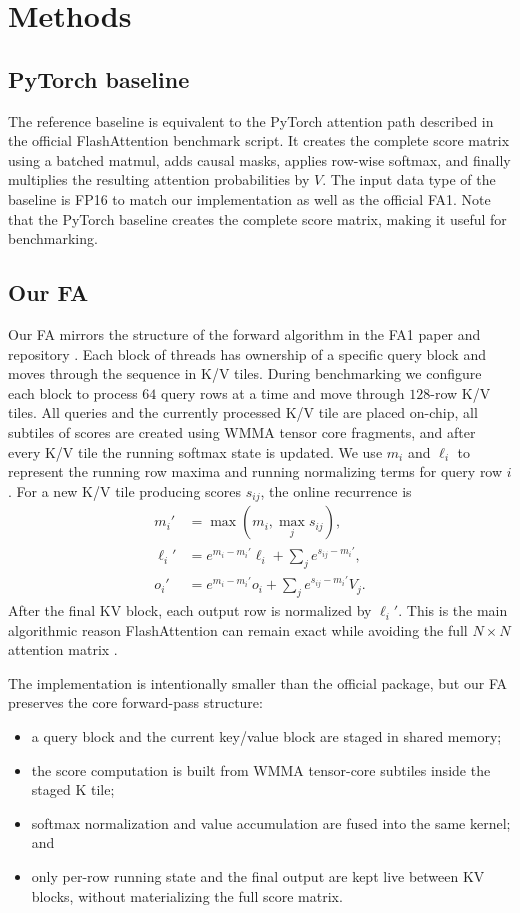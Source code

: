 \documentclass{article}
\begin{document}
\section{Methods}
\subsection{PyTorch baseline}
The reference baseline is equivalent to the PyTorch attention path described in the official FlashAttention benchmark script. It creates the complete score matrix using a batched matmul, adds causal masks, applies row-wise softmax, and finally multiplies the resulting attention probabilities by $V$. The input data type of the baseline is FP16 to match our implementation as well as the official FA1. Note that the PyTorch baseline creates the complete score matrix, making it useful for benchmarking.

\subsection{Our FA}
Our FA mirrors the structure of the forward algorithm in the FA1 paper and repository \citep{dao2022flashattention,dao2022flashattentionrepo}. Each block of threads has ownership of a specific query block and moves through the sequence in K/V tiles. During benchmarking we configure each block to process $64$ query rows at a time and move through $128$-row K/V tiles. All queries and the currently processed K/V tile are placed on-chip, all subtiles of scores are created using WMMA tensor core fragments, and after every K/V tile the running softmax state is updated. We use $m_i$ and $\ell_i$ to represent the running row maxima and running normalizing terms for query row $i$. For a new K/V tile producing scores $s_{ij}$, the online recurrence is
\begin{align}
m_i' &= \max\left(m_i, \max_j s_{ij}\right), \\
\ell_i' &= e^{m_i - m_i'} \ell_i + \sum_j e^{s_{ij} - m_i'}, \\
o_i' &= e^{m_i - m_i'} o_i + \sum_j e^{s_{ij} - m_i'} V_j .
\end{align}
After the final KV block, each output row is normalized by $\ell_i'$. This is the main algorithmic reason FlashAttention can remain exact while avoiding the full $N\times N$ attention matrix \citep{dao2022flashattention}.

The implementation is intentionally smaller than the official package, but our FA preserves the core forward-pass structure:
\begin{itemize}
    \item a query block and the current key/value block are staged in shared memory;
    \item the score computation is built from WMMA tensor-core subtiles inside the staged K tile;
    \item softmax normalization and value accumulation are fused into the same kernel; and
    \item only per-row running state and the final output are kept live between KV blocks, without materializing the full score matrix.
\end{itemize}
\end{document}
